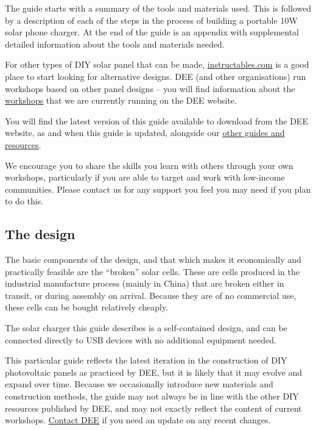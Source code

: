 \documentclass{article}
\theoremstyle{definition}
\theoremstyle{definition}
\theoremstyle{remark}
\begin{document}
    The guide starts with a summary of the tools and materials used. This is followed by a description of each of the steps in the process of building a portable 10W solar phone charger. At the end of the guide is an appendix with supplemental detailed information about the tools and materials needed. 

    For other types of DIY solar panel that can be made, \href{https://www.instructables.com/}{\underline{instructables.com}} is a good place to start looking for alternative designs. DEE (and other organisations) run workshops based on other panel designs – you will find information about the \href{https://www.demandenergyequality.org/our-workshops/}{\underline{workshops}} that we are currently running on the DEE website. 

    You will find the latest version of this guide available to download from the DEE website, as and when this guide is updated, alongside our \href{https://www.demandenergyequality.org/resources/}{\underline{other guides and resources}}. 

    We encourage you to share the skills you learn with others through your own workshops, particularly if you are able to target and work with low-income communities. Please contact us for any support you feel you may need if you plan to do this.


  {\color{blue}\subsection{The design}} %
  \label{ssub:the_design}

    The basic components of the design, and that which makes it economically and practically feasible are the “broken” solar cells. These are cells produced in the industrial manufacture process (mainly in China) that are broken either in transit, or during assembly on arrival. Because they are of no commercial use, these cells can be bought relatively cheaply.

    The solar charger this guide describes is a self-contained design, and can be connected directly to USB devices with no additional equipment needed. 

    This particular guide reflects the latest iteration in the construction of DIY photovoltaic panels as practiced by DEE, but it is likely that it may evolve and expand over time. Because we occasionally introduce new materials and construction methods, the guide may not always be in line with the other DIY resources published by DEE, and may not exactly reflect the content of current workshops. \href{https://www.demandenergyequality.org/contact-us}{\underline{Contact DEE}} if you need an update on any recent changes. 
  
\end{document}
